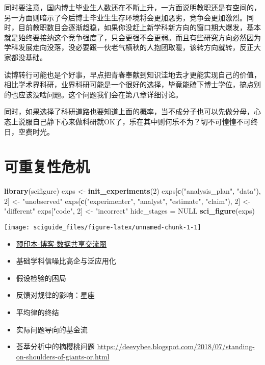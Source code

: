 \documentclass[]{tufte-book}
\newenvironment{Shaded}{}{}
\newcommand{\DecValTok}[1]{\textcolor[rgb]{0.25,0.63,0.44}{#1}}
\newcommand{\KeywordTok}[1]{\textcolor[rgb]{0.00,0.44,0.13}{\textbf{#1}}}
\newcommand{\NormalTok}[1]{#1}
\newcommand{\OtherTok}[1]{\textcolor[rgb]{0.00,0.44,0.13}{#1}}
\newcommand{\StringTok}[1]{\textcolor[rgb]{0.25,0.44,0.63}{#1}}
\providecommand{\tightlist}{%
  \setlength{\itemsep}{0pt}\setlength{\parskip}{0pt}}
\begin{document}
同时要注意，国内博士毕业生人数还在不断上升，一方面说明教职还是有空间的，另一方面则暗示了今后博士毕业生生存环境将会更加恶劣，竞争会更加激烈。同时，目前教职数目会逐渐趋稳，如果你没赶上新学科新方向的窗口期大爆发，基本就是始终要接纳这个竞争强度了，只会更强不会更弱。而且有些研究方向必然因为学科发展走向没落，没必要跟一伙老气横秋的人抱团取暖，该转方向就转，反正大家都没基础。

读博转行可能也是个好事，早点把青春奉献到知识洼地去才更能实现自己的价值，相比学术界科研，业界科研可能是一个很好的选择，毕竟能磕下博士学位，搞点别的也应该没啥问题。这个问题我们会在第八章详细讨论。

同时，如果选择了科研道路也要知道上面的概率，当不成分子也可以先做分母，心态上说服自己静下心来做科研就OK了，乐在其中则何乐不为？切不可惶惶不可终日，空费时光。

\hypertarget{ux53efux91cdux590dux6027ux5371ux673a}{%
\section{可重复性危机}\label{ux53efux91cdux590dux6027ux5371ux673a}}

\begin{Shaded}
\begin{Highlighting}[]
\KeywordTok{library}\NormalTok{(scifigure)}
\NormalTok{exps <-}\StringTok{ }\KeywordTok{init_experiments}\NormalTok{(}\DecValTok{2}\NormalTok{)}
\NormalTok{exps[}\KeywordTok{c}\NormalTok{(}\StringTok{"analysis_plan"}\NormalTok{, }\StringTok{"data"}\NormalTok{), }\DecValTok{2}\NormalTok{] <-}\StringTok{ "unobserved"}
\NormalTok{exps[}\KeywordTok{c}\NormalTok{(}\StringTok{"experimenter"}\NormalTok{, }\StringTok{"analyst"}\NormalTok{, }\StringTok{"estimate"}\NormalTok{, }
    \StringTok{"claim"}\NormalTok{), }\DecValTok{2}\NormalTok{] <-}\StringTok{ "different"}
\NormalTok{exps[}\StringTok{"code"}\NormalTok{, }\DecValTok{2}\NormalTok{] <-}\StringTok{ "incorrect"}
\NormalTok{hide_stages =}\StringTok{ }\OtherTok{NULL}
\KeywordTok{sci_figure}\NormalTok{(exps)}
\end{Highlighting}
\end{Shaded}

\texttt{[image: sciguide\_files/figure-latex/unnamed-chunk-1-1]}

\begin{itemize}
\tightlist
\item
  \href{https://theoreticalecology.wordpress.com/2019/01/22/tree-species-richness-and-its-effects-on-productivity-neither-global-nor-consistent/}{预印本-博客-数据共享交流圈}
\item
  基础学科信噪比高企与泛应用化
\item
  假设检验的困局
\item
  反馈对规律的影响：星座
\item
  平均律的终结
\item
  实际问题导向的基金流
\item
  荟萃分析中的摘樱桃问题
  \url{https://deevybee.blogspot.com/2018/07/standing-on-shoulders-of-giants-or.html}
\end{itemize}
\end{document}
